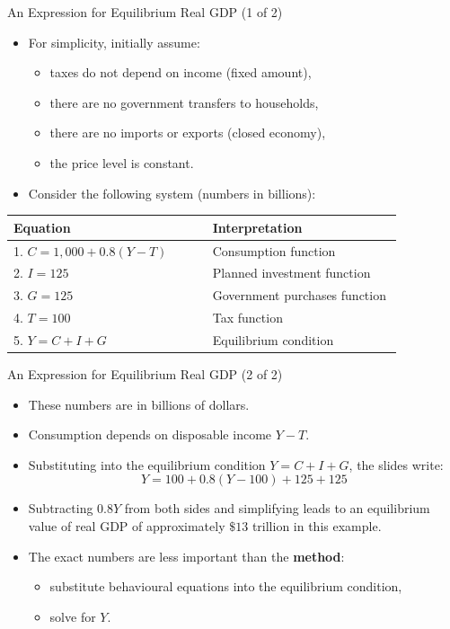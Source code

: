 \documentclass[aspectratio=169]{beamer}
\begin{document}
\begin{frame}{An Expression for Equilibrium Real GDP (1 of 2)}
\transfade
\begin{itemize}
  \item For simplicity, initially assume:
  \begin{itemize}
    \item taxes do not depend on income (fixed amount),
    \item there are no government transfers to households,
    \item there are no imports or exports (closed economy),
    \item the price level is constant.
  \end{itemize}
  \item Consider the following system (numbers in billions):
\end{itemize}
\begin{center}
\small
\begin{tabular}{p{0.44\linewidth} p{0.42\linewidth}}
\toprule
\textbf{Equation} & \textbf{Interpretation} \\
\midrule
1. \( C = 1{,}000 + 0.8(Y - T) \) & Consumption function \\
2. \( I = 125 \) & Planned investment function \\
3. \( G = 125 \) & Government purchases function \\
4. \( T = 100 \) & Tax function \\
5. \( Y = C + I + G \) & Equilibrium condition \\
\bottomrule
\end{tabular}
\end{center}
\end{frame}

\begin{frame}{An Expression for Equilibrium Real GDP (2 of 2)}
\transfade
\begin{itemize}
  \item These numbers are in billions of dollars.
  \item Consumption depends on disposable income \(Y - T\).
  \item Substituting into the equilibrium condition \(Y = C + I + G\), the slides write:
  \[
    Y = 100 + 0.8(Y - 100) + 125 + 125
  \]
  \item Subtracting \(0.8Y\) from both sides and simplifying leads to an equilibrium value of real GDP of approximately \(\$13\) trillion in this example.
  \item The exact numbers are less important than the \textbf{method}:
  \begin{itemize}
    \item substitute behavioural equations into the equilibrium condition,
    \item solve for \(Y\).
  \end{itemize}
\end{itemize}
\end{frame}
\end{document}
